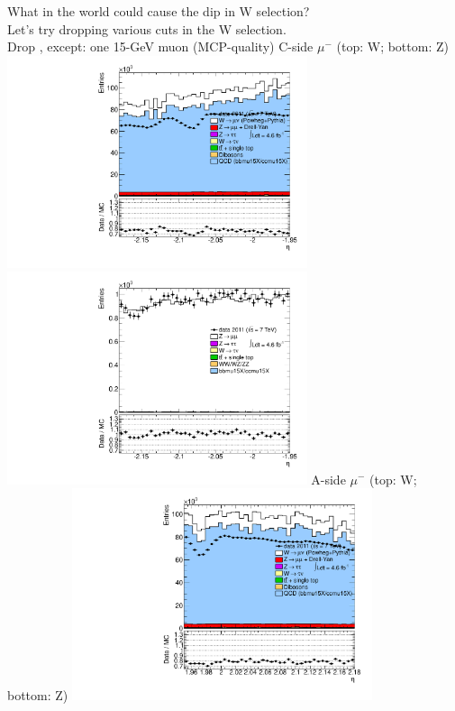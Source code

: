  {
What in the world could cause the dip in W selection? \\
Let's try dropping various cuts in the W selection. \\
Drop , except: one 15-GeV muon (MCP-quality)
}
 {
\colb[T]
C-side $\mu^{-}$ (top: W; bottom: Z)
\centering
\includegraphics[width=0.66\textwidth]{dates/20130306/figures/etaphi/Wnocuts_10_C_stack_l_eta_NEG} \\
\includegraphics[width=0.66\textwidth]{dates/20130306/figures/etaphi/Z_10_C_stack_lN_eta_ALL.pdf}
A-side $\mu^{-}$ (top: W; bottom: Z)
\centering
\includegraphics[width=0.66\textwidth]{dates/20130306/figures/etaphi/Wnocuts_10_A_stack_l_eta_NEG} \\
}
